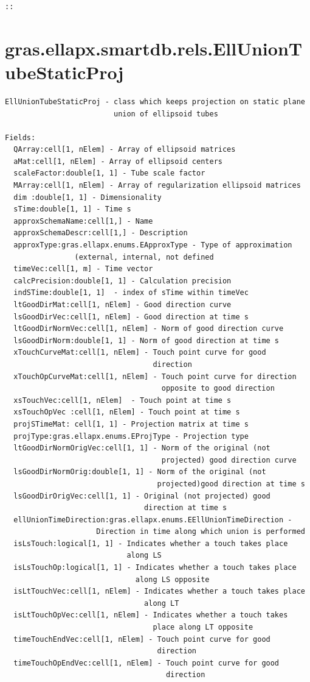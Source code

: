 \documentclass[letterpaper,10pt,english]{sphinxmanual}
\begin{document}
\begin{Verbatim}[commandchars=\\\{\}]
::
\end{Verbatim}


\section{gras.ellapx.smartdb.rels.EllUnionTubeStaticProj}
\label{chap_func:gras-ellapx-smartdb-rels-elluniontubestaticproj}
\begin{Verbatim}[commandchars=\\\{\}]
EllUnionTubeStaticProj - class which keeps projection on static plane
                         union of ellipsoid tubes

Fields:
  QArray:cell[1, nElem] - Array of ellipsoid matrices
  aMat:cell[1, nElem] - Array of ellipsoid centers
  scaleFactor:double[1, 1] - Tube scale factor
  MArray:cell[1, nElem] - Array of regularization ellipsoid matrices
  dim :double[1, 1] - Dimensionality
  sTime:double[1, 1] - Time s
  approxSchemaName:cell[1,] - Name
  approxSchemaDescr:cell[1,] - Description
  approxType:gras.ellapx.enums.EApproxType - Type of approximation
                (external, internal, not defined
  timeVec:cell[1, m] - Time vector
  calcPrecision:double[1, 1] - Calculation precision
  indSTime:double[1, 1]  - index of sTime within timeVec
  ltGoodDirMat:cell[1, nElem] - Good direction curve
  lsGoodDirVec:cell[1, nElem] - Good direction at time s
  ltGoodDirNormVec:cell[1, nElem] - Norm of good direction curve
  lsGoodDirNorm:double[1, 1] - Norm of good direction at time s
  xTouchCurveMat:cell[1, nElem] - Touch point curve for good
                                  direction
  xTouchOpCurveMat:cell[1, nElem] - Touch point curve for direction
                                    opposite to good direction
  xsTouchVec:cell[1, nElem]  - Touch point at time s
  xsTouchOpVec :cell[1, nElem] - Touch point at time s
  projSTimeMat: cell[1, 1] - Projection matrix at time s
  projType:gras.ellapx.enums.EProjType - Projection type
  ltGoodDirNormOrigVec:cell[1, 1] - Norm of the original (not
                                    projected) good direction curve
  lsGoodDirNormOrig:double[1, 1] - Norm of the original (not
                                   projected)good direction at time s
  lsGoodDirOrigVec:cell[1, 1] - Original (not projected) good
                                direction at time s
  ellUnionTimeDirection:gras.ellapx.enums.EEllUnionTimeDirection -
                     Direction in time along which union is performed
  isLsTouch:logical[1, 1] - Indicates whether a touch takes place
                            along LS
  isLsTouchOp:logical[1, 1] - Indicates whether a touch takes place
                              along LS opposite
  isLtTouchVec:cell[1, nElem] - Indicates whether a touch takes place
                                along LT
  isLtTouchOpVec:cell[1, nElem] - Indicates whether a touch takes
                                  place along LT opposite
  timeTouchEndVec:cell[1, nElem] - Touch point curve for good
                                   direction
  timeTouchOpEndVec:cell[1, nElem] - Touch point curve for good
                                     direction


\end{Verbatim}
\end{document}
